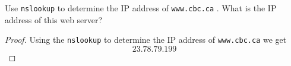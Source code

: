 \documentclass[../../main.tex]{subfiles}
\begin{document}
\begin{wts}
Use \lstinline{nslookup} to determine the IP address of \lstinline{www.cbc.ca} . What is the IP address of this web server?
\end{wts}
\begin{proof}
Using the \lstinline{nslookup} to determine the IP address of  \lstinline{www.cbc.ca} we get\[23.78.79.199\]

\end{proof}
\end{document}
